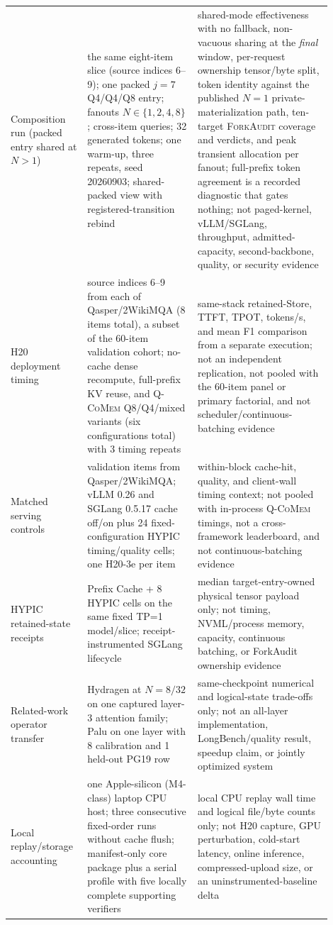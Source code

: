\documentclass{article}
\newcommand{\qcomem}{\textsc{Q-CoMem}}
\newcommand{\method}{\textsc{ForkAudit}}
\begin{document}
\begin{longtable}{@{}>{\raggedright\arraybackslash}p{0.19\linewidth}>{\raggedright\arraybackslash}p{0.32\linewidth}>{\raggedright\arraybackslash}p{0.39\linewidth}@{}}
  Composition run (packed entry shared at $N>1$) & the same eight-item slice (source indices 6--9); one packed $j=7$ Q4/Q4/Q8 entry; fanouts $N\in\{1,2,4,8\}$; cross-item queries; 32 generated tokens; one warm-up, three repeats, seed 20260903; shared-packed view with registered-transition rebind & shared-mode effectiveness with no fallback, non-vacuous sharing at the \emph{final} window, per-request ownership tensor/byte split, token identity against the published $N=1$ private-materialization path, ten-target \method{} coverage and verdicts, and peak transient allocation per fanout; full-prefix token agreement is a recorded diagnostic that gates nothing; not paged-kernel, vLLM/SGLang, throughput, admitted-capacity, second-backbone, quality, or security evidence \\
  H20 deployment timing & source indices 6--9 from each of Qasper/2WikiMQA (8 items total), a subset of the 60-item validation cohort; no-cache dense recompute, full-prefix KV reuse, and \qcomem{} Q8/Q4/mixed variants (six configurations total) with 3 timing repeats & same-stack retained-Store, TTFT, TPOT, tokens/s, and mean F1 comparison from a separate execution; not an independent replication, not pooled with the 60-item panel or primary factorial, and not scheduler/continuous-batching evidence \\
  Matched serving controls & 8 validation items from Qasper/2WikiMQA; vLLM 0.26 and SGLang 0.5.17 cache off/on plus 24 fixed-configuration HYPIC timing/quality cells; one H20-3e per item & within-block cache-hit, quality, and client-wall timing context; not pooled with in-process \qcomem{} timings, not a cross-framework leaderboard, and not continuous-batching evidence \\
  HYPIC retained-state receipts & 8 Prefix Cache + 8 HYPIC cells on the same fixed TP=1 model/slice; receipt-instrumented SGLang lifecycle & median target-entry-owned physical tensor payload only; not timing, NVML/process memory, capacity, continuous batching, or ForkAudit ownership evidence \\
  Related-work operator transfer & Hydragen at $N=8/32$ on one captured layer-3 attention family; Palu on one layer with 8 calibration and 1 held-out PG19 row & same-checkpoint numerical and logical-state trade-offs only; not an all-layer implementation, LongBench/quality result, speedup claim, or jointly optimized system \\
  Local replay/storage accounting & one Apple-silicon (M4-class) laptop CPU host; three consecutive fixed-order runs without cache flush; manifest-only core package plus a serial profile with five locally complete supporting verifiers & local CPU replay wall time and logical file/byte counts only; not H20 capture, GPU perturbation, cold-start latency, online inference, compressed-upload size, or an uninstrumented-baseline delta \\
\end{longtable}
\endgroup
\end{document}
